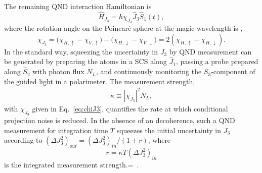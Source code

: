 \documentclass[preprint,aps,pra,onecolumn]{revtex4-1} %
\newcommand{\jz}{\hat{J}_3}
\newcommand{\comment}[1]{{\color{Maroon} #1}}
\begin{document}
The remaining QND interaction Hamiltonian is
	\begin{equation} \label{Eq::FaradayHam}
		\hat{H}_{J_3} = \hbar \chi_{J_3} \jz \hat{S}_1(t),
	\end{equation}
where the rotation angle on the Poincar\`{e} sphere at the magic wavelength is ,
\begin{equation}\label{eq:chiJ3}
\chi_{J_3} = \big( \chi_{H, \uparrow} - \chi_{V,\uparrow} \big) - \big(\chi_{H,\downarrow} - \chi_{V,\downarrow} \big) = 2(\chi_{H, \uparrow}-\chi_{H, \downarrow}).
\end{equation}
In the standard way, squeezing the uncertainty in $J_3$ by QND measurement can be generated by preparing the atoms in a SCS along $\hat{J}_1$,
passing a probe prepared along $\hat{S}_2$ with photon flux $\dot{N}_L$, and continuously monitoring the $S_3$-component of the guided light in a polarimeter. The measurement strength,
	\begin{align} \label{Eq::MeasurementStrength}
		\kappa \equiv |\chi_{J_3}|^2 \dot{N}_L, 
	\end{align}
with $\chi_{J_3}$ given in Eq.~\eqref{eq:chiJ3}, quantifies the rate at which conditional projection noise is reduced. 
In the absence of an decoherence, such a QND measurement for integration time $T$ squeezes the initial uncertainty in $J_3$ according to $(\Delta J_3^2)_{out}= (\Delta J_3^2)_{in}/(1+r)$, where
\begin{equation}
r = \kappa T  (\Delta J_3^2)_{in}
\end{equation}
is the integrated measurement strength.=~\cite{?}.
\end{document}
